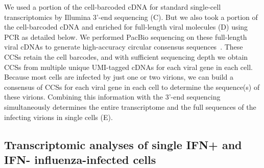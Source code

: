 \documentclass[9pt,lineno]{elife}
\begin{document}
We used a portion of the cell-barcoded cDNA for standard single-cell transcriptomics by Illumina 3'-end sequencing (C).
But we also took a portion of the cell-barcoded cDNA and enriched for full-length viral molecules (D) using PCR as detailed below.
We performed PacBio sequencing on these full-length viral cDNAs to generate high-accuracy circular consensus sequences~\citep[CCSs;][]{travers2010flexible}.
These CCSs retain the cell barcodes, and with sufficient sequencing depth we obtain CCSs from multiple unique UMI-tagged cDNAs for each viral gene in each cell.
Because most cells are infected by just one or two virions, we can build a consensus of CCSs for each viral gene in each cell to determine the sequence(s) of these virions.
Combining this information with the 3'-end sequencing simultaneously determines the entire transcriptome and the full sequences of the infecting virions in single cells (E).

\subsection{Transcriptomic analyses of single IFN+ and IFN- influenza-infected cells} 
\end{document}
